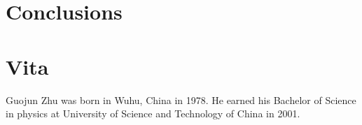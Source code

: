 \documentclass[edeposit,fullpage]{uiucthesis2009}
\begin{document}

\chapter{Conclusions}


\appendix

%



\backmatter



\chapter{Vita}

Guojun  Zhu was born in Wuhu, China in 1978.  He earned his Bachelor of Science in physics at University of Science and Technology of China in 2001.  
\end{document}
